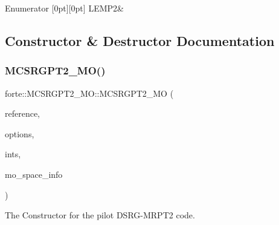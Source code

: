 \begin{DoxyEnumFields}{Enumerator}
[0pt][0pt]{}\mbox{\label{classforte_1_1_m_c_s_r_g_p_t2___m_o_a541d16aa14bd6d3e685b6bda0b8602f1a1988646a02aba967738d55d47907fd28}} 
L\+E\+M\+P2&\\
\hline

\end{DoxyEnumFields}


\subsection{Constructor \& Destructor Documentation}
\mbox{\label{classforte_1_1_m_c_s_r_g_p_t2___m_o_a52774da32a658fa6b46a7b176a8df564}} 
\subsubsection{\texorpdfstring{M\+C\+S\+R\+G\+P\+T2\+\_\+\+M\+O()}{MCSRGPT2\_MO()}}
{\footnotesize\ttfamily forte\+::\+M\+C\+S\+R\+G\+P\+T2\+\_\+\+M\+O\+::\+M\+C\+S\+R\+G\+P\+T2\+\_\+\+MO (\begin{DoxyParamCaption}\item[{\mbox{\hyperlink{classforte_1_1_r_d_ms}{R\+D\+Ms}}}]{reference,  }\item[{std\+::shared\+\_\+ptr$<$ \mbox{\hyperlink{classforte_1_1_forte_options}{Forte\+Options}} $>$}]{options,  }\item[{std\+::shared\+\_\+ptr$<$ \mbox{\hyperlink{classforte_1_1_forte_integrals}{Forte\+Integrals}} $>$}]{ints,  }\item[{std\+::shared\+\_\+ptr$<$ \mbox{\hyperlink{classforte_1_1_m_o_space_info}{M\+O\+Space\+Info}} $>$}]{mo\+\_\+space\+\_\+info }\end{DoxyParamCaption})}



The Constructor for the pilot D\+S\+R\+G-\/\+M\+R\+P\+T2 code. 


